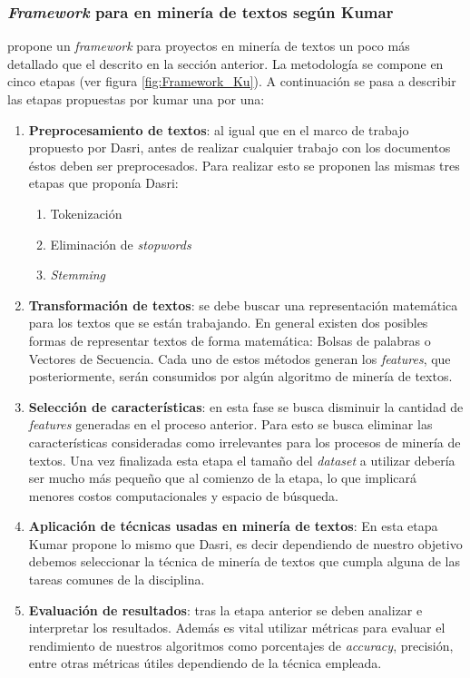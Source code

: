 \subsubsection{\textit{Framework} para en minería de textos según Kumar}
    \cite{kumar2014survey} propone un \textit{framework} para proyectos en minería de textos un poco más detallado que el descrito en la sección anterior. La metodología se compone en cinco etapas (ver figura \ref{fig:Framework_Ku}). A continuación se pasa a describir las etapas propuestas por kumar una por una:
    \begin{enumerate}
        \item \textbf{Preprocesamiento de textos}: al igual que en el marco de trabajo propuesto por Dasri, antes de realizar cualquier trabajo con los documentos éstos deben ser preprocesados. Para realizar esto se proponen las mismas tres etapas que proponía Dasri:
        \begin{enumerate}
            \item Tokenización
            \item Eliminación de \textit{stopwords}
            \item \textit{Stemming}
        \end{enumerate}
        \item \textbf{Transformación de textos}: se debe buscar una representación matemática para los textos que se están trabajando. En general existen dos posibles formas de representar textos de forma matemática: Bolsas de palabras o Vectores de Secuencia. Cada uno de estos métodos generan los \textit{features}, que posteriormente, serán consumidos por algún algoritmo de minería de textos.
        
        \item \textbf{Selección de características}: en esta fase se busca disminuir la cantidad de \textit{features} generadas en el proceso anterior. Para esto se busca eliminar las características consideradas como irrelevantes para los procesos de minería de textos. Una vez finalizada esta etapa el tamaño del \textit{dataset} a utilizar debería ser mucho más pequeño que al comienzo de la etapa, lo que implicará menores costos computacionales y espacio de búsqueda.
        \item \textbf{Aplicación de técnicas usadas en minería de textos}: En esta etapa Kumar propone lo mismo que Dasri, es decir  dependiendo de nuestro objetivo debemos seleccionar la técnica de minería de textos que cumpla alguna de las tareas comunes de la disciplina.

        \item \textbf{Evaluación de resultados}: tras la etapa anterior se deben analizar e interpretar los resultados. Además es vital utilizar métricas para evaluar el rendimiento de nuestros algoritmos como porcentajes de \textit{accuracy}, precisión, entre otras métricas útiles dependiendo de la técnica empleada.
    \end{enumerate}
